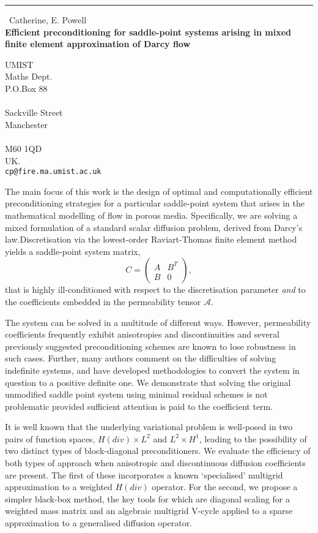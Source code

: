 \documentclass{report}
\begin{document}
\begin{center}
\rule{6in}{1pt} \
{\large Catherine, E. Powell \\
{\bf Efficient preconditioning for saddle-point systems arising in mixed finite element approximation of Darcy flow}}

UMIST \\ Maths Dept. \\ P.O.Box 88 \\ \\ Sackville Street \\ Manchester \\ \\ M60 1QD \\ UK.
\\
{\tt cp@fire.ma.umist.ac.uk}\end{center}

The main focus of this work is the design of optimal and computationally
efficient preconditioning strategies for a particular saddle-point system
that arises in the mathematical modelling of flow in porous media.
Specifically, we are solving a mixed formulation of a standard scalar
diffusion problem, derived from Darcy's law.Discretisation via the
lowest-order Raviart-Thomas finite element method yields a saddle-point
system matrix,
$$ C = \left(\begin{array}{cc} A & B^{T} \\ B & 0
\end{array}\right),$$
\noindent that is highly ill-conditioned with respect to the
discretisation parameter \textit{and} to the coefficients embedded in the
permeability tensor $\mathcal{A}.$

The system can be solved in a multitude of different ways. However,
permeability coefficients frequently exhibit anisotropies and
discontinuities and several previously suggested preconditioning schemes
are known to lose robustness in such cases. Further, many authors comment
on the difficulties of solving indefinite systems, and have developed
methodologies to convert the system in question to a positive definite
one. We demonstrate that solving the original unmodified saddle point
system using minimal residual schemes is not problematic provided
sufficient attention is paid to the coefficient term.

It is well known that the underlying variational problem is well-posed in
two pairs of function spaces, $H(div)\times L^{2}$ and $L^{2} \times
H^{1}$, leading to the possibility of two distinct types of
block-diagonal preconditioners. We evaluate the efficiency of both types
of approach when anisotropic and discontinuous diffusion coefficients are
present. The
first of these incorporates a known `specialised' multigrid approximation
to a weighted $H(div)$ operator. For the
second, we propose a simpler black-box method, the key tools
for which are diagonal scaling for a weighted mass matrix and an
algebraic multigrid V-cycle applied to a sparse approximation to a
generalised diffusion operator.
\end{document}
